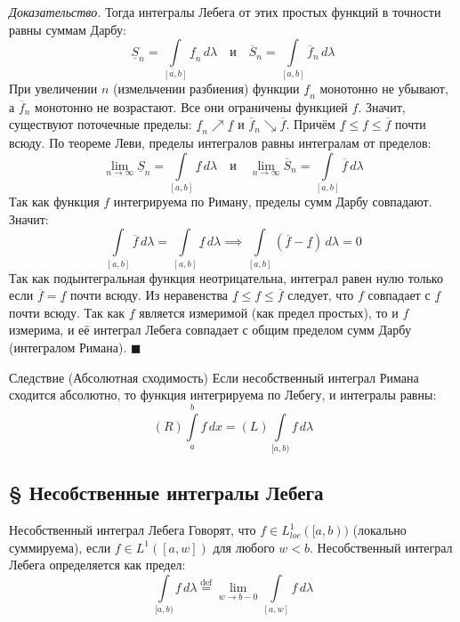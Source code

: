 \documentclass[12pt,a4paper]{article}
\newenvironment{Proof}[1][Доказательство]{\vspace{0.5em}\noindent\textit{#1.}\hspace{0.5em}\ignorespaces}{\hfill$\blacksquare$\vspace{1em}}
\begin{document}
\begin{Proof}
Тогда интегралы Лебега от этих простых функций в точности равны суммам Дарбу:
$$ \underline{S}_n = \int\limits_{[a,b]} \underline{f}_n \, d\lambda \quad \text{и} \quad \overline{S}_n = \int\limits_{[a,b]} \overline{f}_n \, d\lambda $$
При увеличении $n$ (измельчении разбиения) функции $\underline{f}_n$ монотонно не убывают, а $\overline{f}_n$ монотонно не возрастают. Все они ограничены функцией $f$.
Значит, существуют поточечные пределы: $\underline{f}_n \nearrow \underline{f}$ и $\overline{f}_n \searrow \overline{f}$. Причём $\underline{f} \le f \le \overline{f}$ почти всюду.
По теореме Леви, пределы интегралов равны интегралам от пределов:
$$ \lim\limits_{n \to \infty} \underline{S}_n = \int\limits_{[a,b]} \underline{f} \, d\lambda \quad \text{и} \quad \lim\limits_{n \to \infty} \overline{S}_n = \int\limits_{[a,b]} \overline{f} \, d\lambda $$
Так как функция $f$ интегрируема по Риману, пределы сумм Дарбу совпадают. Значит:
$$ \int\limits_{[a,b]} \overline{f} \, d\lambda = \int\limits_{[a,b]} \underline{f} \, d\lambda \implies \int\limits_{[a,b]} (\overline{f} - \underline{f}) \, d\lambda = 0 $$
Так как подынтегральная функция неотрицательна, интеграл равен нулю только если $\overline{f} = \underline{f}$ почти всюду. Из неравенства $\underline{f} \le f \le \overline{f}$ следует, что $f$ совпадает с $\underline{f}$ почти всюду.
Так как $\underline{f}$ является измеримой (как предел простых), то и $f$ измерима, и её интеграл Лебега совпадает с общим пределом сумм Дарбу (интегралом Римана).
\end{Proof}

\begin{Theorem}{Следствие (Абсолютная сходимость) }{}
Если несобственный интеграл Римана сходится абсолютно, то функция интегрируема по Лебегу, и интегралы равны:
$$ (R) \int\limits_a^b f \, dx = (L) \int\limits_{[a, b)} f \, d\lambda $$
\end{Theorem}

\subsection{§ Несобственные интегралы Лебега}

\begin{Definition}{Несобственный интеграл Лебега}{}
Говорят, что $f \in L^1_{loc}([a,b))$ (локально суммируема), если $f \in L^1([a, w])$ для любого $w < b$. 
Несобственный интеграл Лебега определяется как предел:
$$ \int\limits_{[a, b)} f \, d\lambda \stackrel{\text{def}}{=} \lim\limits_{w \to b-0} \int\limits_{[a, w]} f \, d\lambda $$
\end{Definition}
\end{document}
